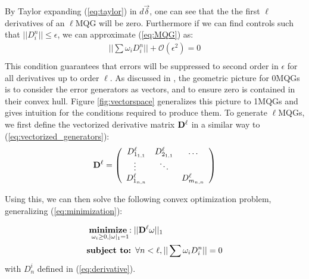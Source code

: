 \documentclass[aps,nofootinbib,pra,notitlepage,twocolumn]{revtex4-1}
\begin{document}
By Taylor expanding (\ref{eq:taylor}) in $d\vec{\delta}$, one can see that the the first $\ell$ derivatives of an $\ell$MQG will be zero. Furthermore if we can find controls such that $||D_i^n||\leq\epsilon$, we can approximate (\ref{eq:MQG}) as:
\begin{equation}\label{eq:MQG-relaxed}
\begin{gathered}
||\sum\omega_iD^n_i||+ \mathcal{O}(\epsilon^2) = 0\\
\end{gathered}
\end{equation}
This condition guarantees that errors will be suppressed to second order in $\epsilon$ for all derivatives up to order $\ell$. %
As discussed in \cite{Campbell2017}, the geometric picture for 0MQGs is to consider the error generators as vectors, and to ensure zero is contained in their convex hull. Figure \ref{fig:vectorspace} generalizes this picture to 1MQGs and gives intuition for the conditions required to produce them. To generate $\ell$MQGs, we first define the vectorized derivative matrix ${\bold{D}^{\ell}}$ in a similar way to (\ref{eq:vectorized_generators}):
\begin{equation}
{\bold{D}^{\ell}} =  \left(\begin{array}{cccc}
		D^\ell_{1_{1,1}} & D^\ell_{2_{1,1}} & \ldots   \\ 
		\vdots\ & \ddots &    \\
		D^\ell_{1_{n,n}} &  &  D^\ell_{m_{n,n}} \\ 
	\end{array} 	
	\right)
\end{equation}

Using this, we can then solve the following convex optimization problem, generalizing (\ref{eq:minimization}):

\begin{equation}\label{eq:robust_minimization}
  \begin{split}
    &\underset{\omega_i\geq0, |\omega|_1=1}{\textbf{minimize}: } ||{\bold{D}^{\ell}}\omega||_1\\
    &\textbf{subject to: } \forall n<\ell, ||\sum \omega_iD_i^n||=0\\
  \end{split}
\end{equation}
with $D_n^i$ defined in (\ref{eq:derivative}). 
\end{document}
